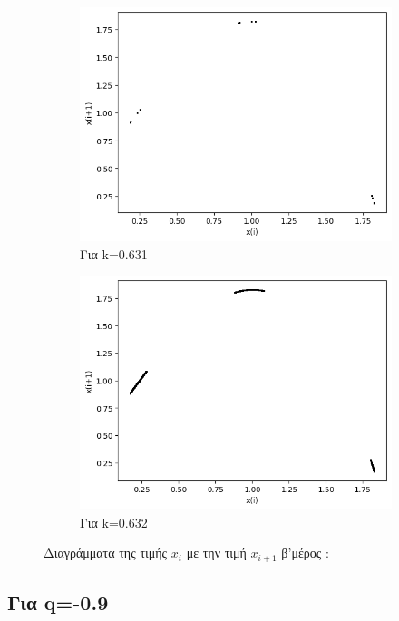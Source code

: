 \begin{figure}[h!]
\begin{subfigure}[b]{0.4\textwidth}
		\includegraphics[width=\textwidth]{LateX images/graphs q07/g12}
		\caption{Για k=0.631}
		\label{f:k46}
	\end{subfigure}
	\hfill
	\begin{subfigure}[b]{0.4\textwidth}
	\centering
	\includegraphics[width=\textwidth]{LateX images/graphs q07/g13}
	\caption{Για k=0.632}
	\label{f:k47}
	\end{subfigure}
\caption{Διαγράμματα της τιμής \(x_i\) με την τιμή \(x_{i+1}\) β'μέρος :}	
\end{figure}

\clearpage

\subsection{Για q=-0.9}

